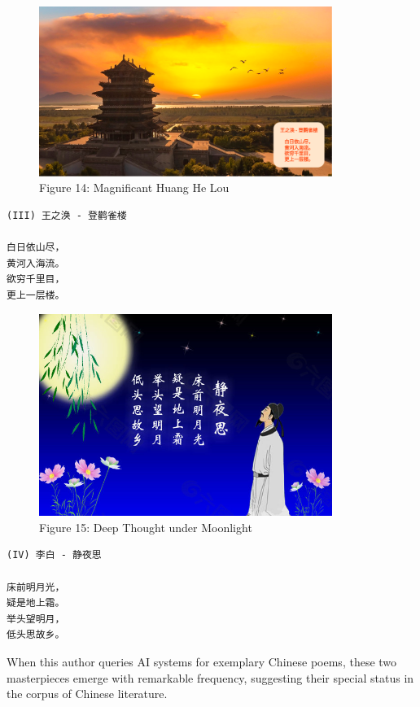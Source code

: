 \documentclass[
  11pt,
  letterpaper,
]{article}
\begin{document}
\begin{figure}
\centering
\includegraphics[width=0.85\textwidth]{./images/poem_huang-he-lou.png}
\caption{Figure 14: Magnificant Huang He Lou}
\end{figure}

\begin{verbatim}
(III) 王之涣 - 登鹳雀楼

白日依山尽，
黄河入海流。
欲穷千里目，
更上一层楼。
\end{verbatim}

\begin{figure}
\centering
\includegraphics[width=0.85\textwidth]{./images/poem_moonlight.jpg}
\caption{Figure 15: Deep Thought under Moonlight}
\end{figure}

\begin{verbatim}
(IV) 李白 - 静夜思

床前明月光，
疑是地上霜。
举头望明月，
低头思故乡。
\end{verbatim}

When this author queries AI systems for exemplary Chinese poems, these
two masterpieces emerge with remarkable frequency, suggesting their
special status in the corpus of Chinese literature.
\end{document}
